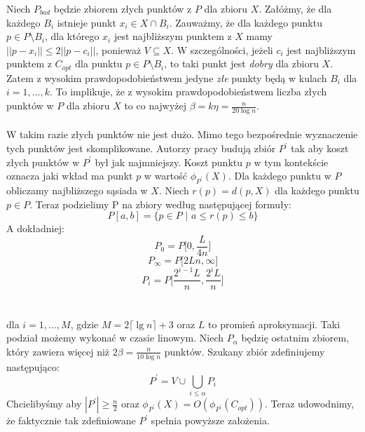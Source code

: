 \noindent
Niech $P_{bad}$ będzie zbiorem złych punktów z $P$ dla zbioru $X$.
Załóżmy, że dla każdego $B_{i}$ istnieje punkt $x_{i} \in X \cap B_{i}$.
Zauważmy, że dla każdego punktu $p \in P \setminus B_{i}$, dla którego $x_{i}$ jest najbliższym punktem z $X$ mamy $||p - x_{i}|| \leq 2||p - c_{i}||$, ponieważ $V \subseteq X$.
W szczególności, jeżeli $c_{i}$ jest najbliższym punktem z $C_{opt}$ dla punktu  $p \in P \setminus B_{i}$, to taki punkt jest \textit{dobry} dla zbioru $X$.
Zatem z wysokim prawdopodobieństwem jedyne \textit{złe} punkty będą w kulach $B_{i}$ dla $ i = 1, \dots, k$.
To implikuje, że z wysokim prawdopodobieństwem liczba złych punktów w $P$ dla zbioru $X$ to co najwyżej $\beta = k\eta = \frac{n}{20 \log n}$.
\\~\\
W takim razie złych punktów nie jest dużo.
Mimo tego bezpośrednie wyznaczenie tych punktów jest skomplikowane.
Autorzy pracy \cite{10.1145/1007352.1007400} budują zbiór $P^{'}$ tak aby koszt złych punktów w $P^{'}$ był jak najmniejszy.
Koszt punktu $p$ w tym kontekście oznacza jaki wkład ma punkt $p$ w wartość $\phi_{P^{'}}(X)$.
Dla każdego punktu w $P$ obliczamy najbliższego sąsiada w $X$.
Niech $r(p) = d(p, X)$ dla każdego punktu $p \in P$.
Teraz podzielimy P na zbiory według następującej formuły:
\begin{equation}
    P[a,b] = \{ p \in P \text{ | } a \leq r(p) \leq b \}
\end{equation}
A dokładniej:
\begin{equation}
    P_{0} = P\Big[0, \frac{L}{4n}\Big]
\end{equation}
\begin{equation}
    P_{ \infty } = P\Big[2Ln, \infty \Big]
\end{equation}
\begin{equation}
    P_{i} = P\Big[ \frac{2^{i-1}L}{n}, \frac{2^{i}L}{n} \Big]
\end{equation}
\\~\\
dla $i = 1, \dots, M$, gdzie $M = 2 \lceil \lg n \rceil + 3$ oraz $L$ to promień aproksymacji.
Taki podział możemy wykonać w czasie linowym.
Niech $P_{\alpha}$ będzię ostatnim zbiorem, który zawiera więcej niż $2\beta = \frac{n}{10 \log n}$ punktów. 
Szukany zbiór zdefiniujemy następująco:
\begin{equation}
    P^{'} = V \cup \bigcup_{i \leq \alpha} P_{i}
\end{equation}
Chcielibyśmy aby $|P^{'}| \geq \frac{n}{2}$ oraz $\phi_{P^{'}}(X) = O(\phi_{P^{'}}(C_{opt}))$.
Teraz udowodnimy, że faktycznie tak zdefiniowane $P^{'}$ spełnia powyższe założenia.

